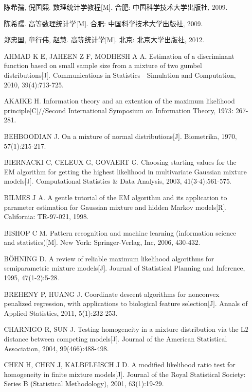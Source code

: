 \documentclass[a4paper,12pt,openany,oneside,utf-8]{ctexbook}
\begin{document}
\begin{enumerate}[{[}1{]}]

\item 	陈希孺, 倪国熙. 数理统计学教程[M]. 合肥: 中国科学技术大学出版社, 2009.
\item 	陈希孺. 高等数理统计学[M]. 合肥: 中国科学技术大学出版社, 2009.
\item 	郑忠国, 童行伟, 赵慧. 高等统计学[M]. 北京: 北京大学出版社, 2012.
\item 	AHMAD K E, JAHEEN Z F, MODHESH A A. Estimation of a discriminant function based on small sample size from a mixture of two gumbel distributions[J]. Communications in Statistics - Simulation and Computation, 2010, 39(4):713-725.
\item 	AKAIKE H. Information theory and an extention of the maximum likelihood principle[C]//Second International Symposium on Information Theory, 1973: 267-281.
\item 	BEHBOODIAN J. On a mixture of normal distributions[J]. Biometrika, 1970, 57(1):215-217.
\item 	BIERNACKI C, CELEUX G, GOVAERT G. Choosing starting values for the EM algorithm for getting the highest likelihood in multivariate Gaussian mixture models[J]. Computational Statistics \& Data Analysis, 2003, 41(3-4):561-575.
\item 	BILMES J A. A gentle tutorial of the EM algorithm and its application to parameter estimation for Gaussian mixture and hidden Markov models[R]. California: TR-97-021, 1998.
\item 	BISHOP C M. Pattern recognition and machine learning (information science and statistics)[M]. New York: Springer-Verlag, Inc, 2006, 430-432.
\item 	BÖHNING D. A review of reliable maximum likelihood algorithms for semiparametric mixture models[J]. Journal of Statistical Planning and Inference, 1995, 47(1-2):5-28.
\item 	BREHENY P, HUANG J. Coordinate descent algorithms for nonconvex penalized regression, with applications to biological feature selection[J]. Annals of Applied Statistics, 2011, 5(1):232-253.
\item 	CHARNIGO R, SUN J. Testing homogeneity in a mixture distribution via the L2 distance between competing models[J]. Journal of the American Statistical Association, 2004, 99(466):488-498.
\item 	CHEN H, CHEN J, KALBFLEISCH J D. A modified likelihood ratio test for homogeneity in finite mixture models[J]. Journal of the Royal Statistical Society: Series B (Statistical Methodology), 2001, 63(1):19-29.

\end{enumerate}
\end{document}

